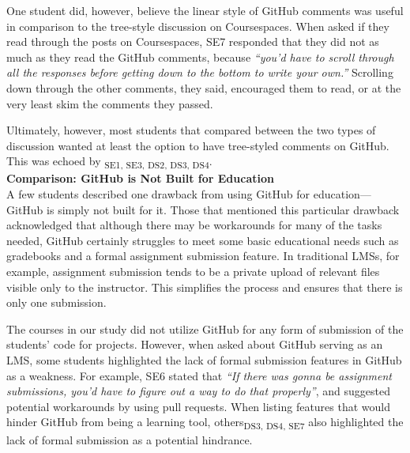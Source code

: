 One student did, however, believe the linear style of GitHub comments was useful in comparison to the tree-style discussion on Coursespaces. When asked if they read through the posts on Coursespaces, SE7 responded that they did not as much as they read the GitHub comments, because \textit{``you'd have to scroll through all the responses before getting down to the bottom to write your own.''} Scrolling down through the other comments, they said, encouraged them to read, or at the very least skim the comments they passed. %


Ultimately, however, most students that compared between the two types of discussion wanted at least the option to have tree-styled comments on GitHub. This was echoed by \textsubscript{SE1, SE3, DS2, DS3, DS4}. \\

\textbf{Comparison: GitHub is Not Built for Education} \\
A few students described one drawback from using GitHub for education---GitHub is simply not built for it. Those that mentioned this particular drawback acknowledged that although there may be workarounds for many of the tasks needed, GitHub certainly struggles to meet some basic educational needs such as gradebooks and a formal assignment submission feature. In traditional LMSs, for example, assignment submission tends to be a private upload of relevant files visible only to the instructor. This simplifies the process and ensures that there is only one submission.

The courses in our study did not utilize GitHub for any form of submission of the students' code for projects. However, when asked about GitHub serving as an LMS, some students highlighted the lack of formal submission features in GitHub as a weakness. For example, SE6 stated that \textit{``If there was gonna be assignment submissions, you'd have to figure out a way to do that properly''}, and suggested potential workarounds by using pull requests. When listing features that would hinder GitHub from being a learning tool, others\textsubscript{DS3, DS4, SE7} also highlighted the lack of formal submission as a potential hindrance.

